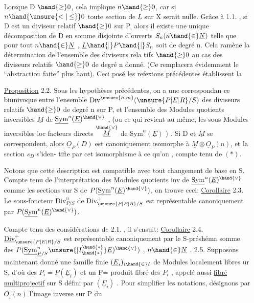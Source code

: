 
Lorsque D $\hand{\geq} 0$, cela implique $n \hand{\geq} 0$, car si  $n \hand{\unsure{<|\leq}} 0$ toute section de
$\underline{L}$ sur X serait nulle. Grâce à 1.1. , si D est un diviseur relatif
$\hand{\geq} 0$ sur P, alors il existe une unique décomposition de D en somme
disjointe d'ouverts $S_n (n \hand{\in} \underline{N})$ telle que pour tout $n \hand{\in} \underline{N}$ , $\underline{L}\hand{|}P\hand{|}S_n$ soit de
degré n. Cela ramène la détermination de l'ensemble des diviseurs rela%
tifs $\hand{\geq} 0$ au cas des diviseurs relatifs $\hand{\geq} 0$ de degré n donné. (Ce
\placedmargin{$/\!/$}  remplacera évidemment le ``abstraction faite'' plus haut). Ceci posé
les refexions précédentes établissent la

\uline{Proposition} 2.2. Sous les hypothèses précédentes, on a une correspondan%
ce biunivoque entre l'ensemble $\mathrm{Div}^{\unsure{n|m}}(\unsure{P|E|R}/S)$ des diviseurs relatifs $\hand{\geq} 0$ de
degré n sur P, et l'ensemble des Modules quotients inversibles $\underline{M}$ de
$\underline{\mathrm{Sym}}^{n}(\underline{E})^{\hand{\vee}}$ , (ou ce qui revient au même, les sous-Modules inversibles loc
facteurs directs $\overset{\hand{\vee}}{\underline{M}}$ de $\underline{\mathrm{Sym}}^{n}(\underline{E})$ ) . Si D et $\underline{M}$ se correspondent, alors
$\underline{O}_P(D)$ est canoniquement isomorphe à $\underline{M}\otimes\underline{O}_P(n)$, et la section $s_D$ s'iden-%
tifie par cet isomorphisme à ce qu'on , compte tenu de $(*)$.

Notons que cette description est compatible avec tout changement de
base en S. Compte tenu de l'interprétation des Modules quotients inv de
$\underline{\mathrm{Sym}}^{n}(\underline{E})^{\hand{\vee}}$ comme les sections sur S de $P(\underline{\mathrm{Sym}}^{n}(\underline{E})^{\hand{\vee}})$, on trouve ceci:
\uline{Corollaire} 2.3. Le sous-foncteur  $\mathrm{Div}^{n}_{P/S}$ de $\mathrm{Div}^{+}_{\unsure{P|E|R}/S}$ est représentable
canoniquement par $P(\underline{\mathrm{Sym}}^{n}(\underline{E})^{\hand{\vee}})$.

Compte tenu des considérations de 2.1. , il s'ensuit:
\uline{Corollaire} 2.4. $\underline{\mathrm{Div}}^{+}_{\unsure{P|E|R}/S}$ est représentable canoniquement  par
le S-préshéma somme des $P(\underline{\mathrm{Sym}}^{n}_{\underline{P}/S}\unsure{|I^{\hand{*}}_{\hand{*}}}\underline{E})^{\hand{\vee}})$ , $n \hand{\in} \underline{N}$ .
2.5. Supposons maintenant donné une famille finie $(\underline{E}_i)_{i \hand{\in} I}$ de Modules
localement libres ur S, d'où des $P_i = P(\underline{E}_i)$ et un P= produit fibré des
$P_i$ , appelé aussi \uline{fibré multiprojectif} sur S défini par $(\underline{E}_i)$ . Pour
simplifier les notations, désignons par $\underline{O}_i(n)$ l'image inverse sur P du

